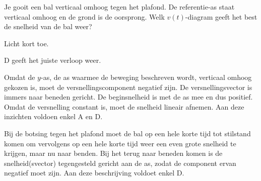 
\begin{exercise}


\item{}\begin{minipage}[t]{.45\linewidth}
Je gooit een bal verticaal omhoog tegen het plafond. De referentie-as staat verticaal omhoog en de grond is de oorsprong. %
Welk $v(t)$-diagram geeft het best de snelheid van de bal weer? 

\vspace{\baselineskip}
Licht kort toe.
\end{minipage}
\hfill
\begin{minipage}[t]{.5\linewidth}
	\raisebox{1ex-\height}{%
		\texttt{[image: 3p90]}} 
\end{minipage}

\begin{oplossing}
D geeft het juiste verloop weer.

Omdat de $y$-as, de as waarmee de beweging beschreven wordt, verticaal omhoog gekozen is, moet de versnellingscomponent negatief zijn. De versnellingsvector is immers naar beneden gericht. De beginsnelheid is met de as mee en dus positief. Omdat de versnelling constant is, moet de snelheid lineair afnemen. Aan deze inzichten voldoen enkel A en D.

Bij de botsing tegen het plafond moet de bal op een hele korte tijd tot stilstand komen om vervolgens op een hele korte tijd weer een even grote snelheid te krijgen, maar nu naar benden. Bij het terug naar beneden komen is de snelheid(svector) tegengesteld gericht aan de as, zodat de component ervan negatief moet zijn. Aan deze beschrijving voldoet enkel D.

\end{oplossing}

\end{exercise}
